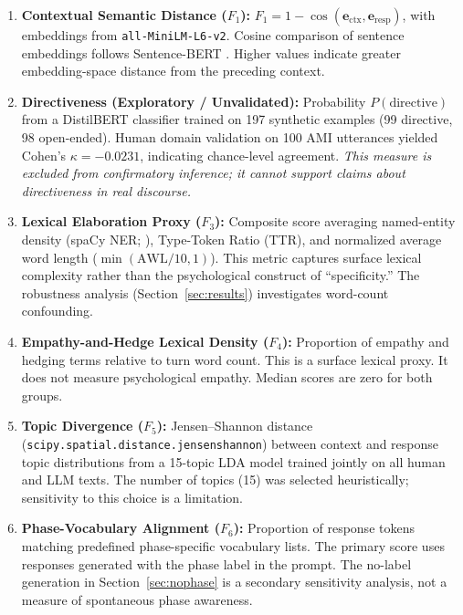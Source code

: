 \documentclass[10pt,journal,compsoc]{IEEEtran}
\begin{document}
\begin{enumerate}
    \item \textbf{Contextual Semantic Distance ($F_1$):} $F_1 = 1 - \cos(\mathbf{e}_{\text{ctx}}, \mathbf{e}_{\text{resp}})$, with embeddings from \texttt{all-MiniLM-L6-v2}. Cosine comparison of sentence embeddings follows Sentence-BERT \cite{reimers2019}. Higher values indicate greater embedding-space distance from the preceding context.

    \item \textbf{Directiveness (Exploratory / Unvalidated):} Probability $P(\text{directive})$ from a DistilBERT classifier \cite{sanh2019distilbert} trained on 197 synthetic examples (99 directive, 98 open-ended). Human domain validation on 100 AMI utterances yielded Cohen's $\kappa = -0.0231$, indicating chance-level agreement. \emph{This measure is excluded from confirmatory inference; it cannot support claims about directiveness in real discourse.}

    \item \textbf{Lexical Elaboration Proxy ($F_3$):} Composite score averaging named-entity density (spaCy NER; \cite{spacy2017}), Type-Token Ratio (TTR), and normalized average word length ($\min(\text{AWL}/10, 1)$). This metric captures surface lexical complexity rather than the psychological construct of ``specificity.'' The robustness analysis (Section~\ref{sec:results}) investigates word-count confounding.

    \item \textbf{Empathy-and-Hedge Lexical Density ($F_4$):} Proportion of empathy and hedging terms relative to turn word count. This is a surface lexical proxy. It does not measure psychological empathy. Median scores are zero for both groups.

    \item \textbf{Topic Divergence ($F_5$):} Jensen--Shannon distance (\texttt{scipy.spatial.distance.jensenshannon}) between context and response topic distributions from a 15-topic LDA model \cite{blei2003lda} trained jointly on all human and LLM texts. The number of topics (15) was selected heuristically; sensitivity to this choice is a limitation.

    \item \textbf{Phase-Vocabulary Alignment ($F_6$):} Proportion of response tokens matching predefined phase-specific vocabulary lists. The primary score uses responses generated with the phase label in the prompt. The no-label generation in Section~\ref{sec:nophase} is a secondary sensitivity analysis, not a measure of spontaneous phase awareness.
\end{enumerate}
\end{document}
